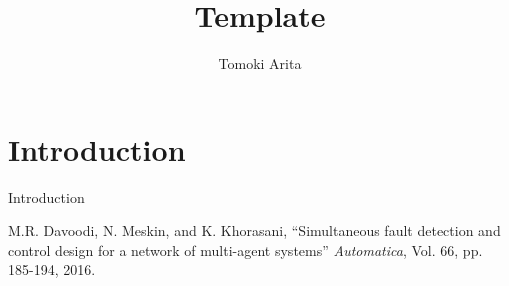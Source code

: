 \documentclass[a4paper,fleqn,10pt,twocolumn]{template_v1.0}
\title{Template}
\author{Tomoki Arita}
\begin{document}
\maketitle


\section{Introduction}
Introduction

\begin{thebibliography}{9}
M.R. Davoodi, N. Meskin, and K. Khorasani, ``Simultaneous fault detection and control design for a network of multi-agent systems'' {\it Automatica}, Vol. 66, pp. 185-194, 2016.

\end{thebibliography}
\end{document}
